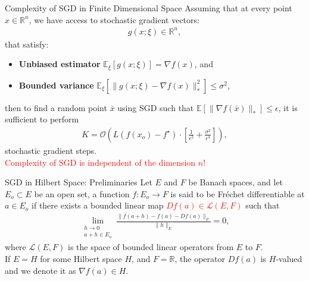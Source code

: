 \documentclass[dvipsnames, handout]{beamer}
\newcommand{\1}{\mathds{1}}	%
\begin{document}
\begin{frame}{Complexity of SGD in Finite Dimensional Space}
    Assuming that at every point $x \in \mathbb{R}^n$, we have access to stochastic gradient vectors:
    \begin{align*}
        g(x; \xi) \in \mathbb{R}^n,
    \end{align*}
    that satisfy:
    \begin{itemize}
        \item \textbf{Unbiased estimator} $\mathbb{E}_{\xi} [g(x; \xi)] = \nabla f(x)$, and
        \item \textbf{Bounded variance} $\mathbb{E}_{\xi} \left[\|g(x; \xi) - \nabla f(x)\|^2_*\right] \leq \sigma^2$,
    \end{itemize}
    then to find a random point $\bar{x}$ using SGD
    such that $\mathbb{E}[\| \nabla f(\bar{x}) \|_*] \leq \epsilon$, it is sufficient to perform
    \begin{align*}
        K = \mathcal{O}\left(L (f(x_o) - f^{\star}) \cdot \left[\frac{1}{\epsilon^2} + \frac{\sigma^2}{\epsilon^4}\right]\right),
    \end{align*}
    stochastic gradient steps.\\
    \textcolor{red}{Complexity of SGD is independent of the dimension $n$!}
\end{frame}

\begin{frame}{SGD in Hilbert Space: Preliminaries}
    Let $E$ and $F$ be Banach spaces, and let $E_o \subset E$ be an open set, a function $f: E_o \rightarrow F$ is said to be Fréchet differentiable at $a \in E_o$ if there exists a bounded linear map \textcolor{red}{$Df(a) \in \mathcal{L}(E, F)$} such that
    \begin{align*}
        \lim_{\substack{h \rightarrow 0\\a+h \in E_o}} \frac{\|f(a+h) - f(a) - Df(a)\|_F}{\|h\|_E} = 0,
    \end{align*}
    where $\mathcal{L}(E, F)$ is the space of bounded linear operators from $E$ to $F$.\\
    If $E = H$ for some Hilbert space $H$, and $F = \mathbb{R}$, the operator $Df(a)$ is $H$-valued and we denote it as $\nabla f(a) \in H$.
\end{frame}
\end{document}
